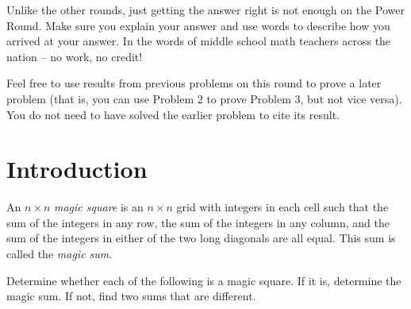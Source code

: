 \documentclass[11pt]{article}
\renewenvironment{problem}{\begin{problems}}{\end{problems}\vspace{5pt}}
\begin{document}
\setlength{\parindent}{0pt}

Unlike the other rounds, just getting the answer right is not enough on the Power Round. 
Make sure you explain your answer and use words to describe how you arrived at your answer. 
In the words of middle school math teachers across the nation -- no work, no credit! \newline

Feel free to use results from previous problems on this round to prove a later problem 
(that is, you can use Problem 2 to prove Problem 3, but not vice versa). 
You do not need to have solved the earlier problem to cite its result.

\section{Introduction}

\begin{definition}
An $n \times n$ \textit{magic square} is an $n \times n$ grid with integers in each cell such that
the sum of the integers in any row, the sum of the integers in any column, and the sum of the integers
in either of the two long diagonals are all equal. This sum is called the \textit{magic sum}.
\end{definition}

\begin{problem}[3=1+1+1 points]
Determine whether each of the following is a magic square. If it is, determine the magic sum. If not, find two sums that are different.

\begin{figure}[H]
\centering
{}
\qquad \qquad
{}
\qquad \qquad
{}
\end{figure}
\end{problem}
\end{document}
